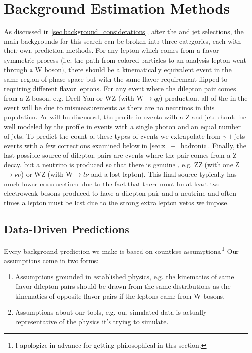   \FloatBarrier

\section{Background Estimation Methods} \label{sec:background_estimation_methods}
  
  As discussed in \ref{sec:background_considerations}, after the \Mll and jet selections, the main backgrounds for this search can be broken into three categories, each with their own prediction methods. For any lepton which comes from a flavor symmetric process (i.e. the path from colored particles to an analysis lepton went through a W boson), there should be a kinematically equivalent event in the same region of phase space but with the same flavor requirement flipped to requiring different flavor leptons. For any event where the dilepton pair comes from a Z boson, e.g. Drell-Yan or WZ (with W$\to q\bar{q}$) production, all of the \MET in the event will be due to mismeasurements as there are no neutrinos in this population. As will be discussed, the \MET profile in events with a Z and jets should be well modeled by the \MET profile in events with a single photon and an equal number of jets. To predict the count of these types of events we extrapolate from $\gamma+$jets events with a few corrections examined below in \ref{sec:z_+_hadronic}. Finally, the last possible source of dilepton pairs are events where the pair comes from a Z decay, but a neutrino is produced so that there is genuine \MET, e.g. ZZ (with one Z$\to\nu\nu$) or WZ (with W$\to l \nu$ and a lost lepton). This final source typically has much lower cross sections due to the fact that there must be at least two electroweak bosons produced to have a dilepton pair and a neutrino and often times a lepton must be lost due to the strong extra lepton vetos we impose.

  \subsection{Data-Driven Predictions}
    Every background prediction we make is based on countless assumptions.\footnote{I apologize in advance for getting philosophical in this section.} Our assumptions come in two forms:

    \begin{enumerate}
      \item Assumptions grounded in established physics, e.g. the kinematics of same flavor dilepton pairs should be drawn from the same distributions as the kinematics of opposite flavor pairs if the leptons came from W bosons.

      \item Assumptions about our tools, e.g. our simulated data is actually representative of the physics it's trying to simulate.

    \end{enumerate}

